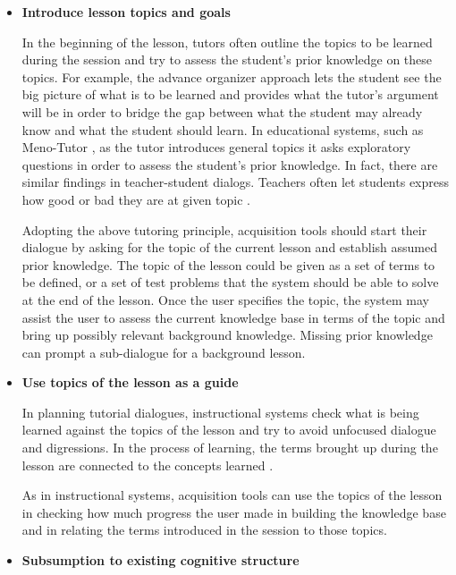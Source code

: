 \documentclass{llncs}
\begin{document}
\begin{itemize}
\item {\bf Introduce lesson topics and goals}

In the beginning of the lesson, tutors often outline the topics to be learned
during the session and try to assess the student's prior knowledge on
these topics.  For example, the advance organizer approach \cite{Ausubel68}
lets the student see the big picture of what is to be learned and provides
what the tutor's argument will be in order to bridge the gap between what the
student may already know and what the student should learn.  In educational
systems, such as Meno-Tutor \cite{woolf84}, as the tutor introduces general
topics it asks exploratory questions in order to assess the student's prior
knowledge.  In fact, there are similar findings in teacher-student dialogs.
Teachers often let students express how good or bad they are at given
topic \cite{Fox93}.

\vspace*{0.5em}
Adopting the above tutoring principle, acquisition tools should start their
dialogue by asking for the topic of the current lesson and establish assumed
prior knowledge.  
The topic of the lesson could be given as a set of terms to be defined, or a
set of test problems that the system should be able to solve at the end of the
lesson.
Once the user specifies the topic, the system may assist the user
to assess the current knowledge base in terms of the topic and bring up
possibly relevant background knowledge. Missing prior knowledge can prompt a
sub-dialogue for a background lesson.

\vspace*{0.5em}
\item {\bf Use topics of the lesson as a guide}

In planning tutorial dialogues, instructional systems check what is being
learned against the topics of the lesson \cite{Core00} and try to avoid
unfocused dialogue and digressions.  In the process of learning, the
terms brought up during the lesson are connected to the concepts learned
\cite{Sleeman84}.

\vspace*{0.5em}
As in instructional systems, acquisition tools can use the topics of the
lesson in checking how much progress the user made in
building the knowledge base and in relating the terms introduced in the
session to those topics.

\vspace*{0.5em}
\item {\bf Subsumption to existing cognitive structure}


\end{itemize}
\end{document}
